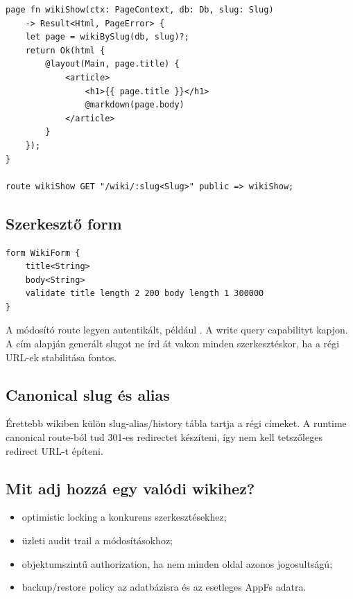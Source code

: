 \begin{lstlisting}[language=RWLang]
page fn wikiShow(ctx: PageContext, db: Db, slug: Slug)
    -> Result<Html, PageError> {
    let page = wikiBySlug(db, slug)?;
    return Ok(html {
        @layout(Main, page.title) {
            <article>
                <h1>{{ page.title }}</h1>
                @markdown(page.body)
            </article>
        }
    });
}

route wikiShow GET "/wiki/:slug<Slug>" public => wikiShow;
\end{lstlisting}

\subsection*{Szerkesztő form}

\begin{lstlisting}[language=RWLang]
form WikiForm {
    title<String>
    body<String>
    validate title length 2 200 body length 1 300000
}
\end{lstlisting}

A módosító route legyen autentikált, például . A write query  capabilityt kapjon. A cím alapján generált slugot ne írd át vakon minden szerkesztéskor, ha a régi URL-ek stabilitása fontos.

\subsection*{Canonical slug és alias}

Érettebb wikiben külön slug-alias/history tábla tartja a régi címeket. A runtime canonical route-ból tud 301-es redirectet készíteni, így nem kell tetszőleges redirect URL-t építeni.

\subsection*{Mit adj hozzá egy valódi wikihez?}

\begin{itemize}
  \item optimistic locking a konkurens szerkesztésekhez;
  \item üzleti audit trail a módosításokhoz;
  \item objektumszintű authorization, ha nem minden oldal azonos jogosultságú;
  \item backup/restore policy az adatbázisra és az esetleges AppFs adatra.
\end{itemize}


